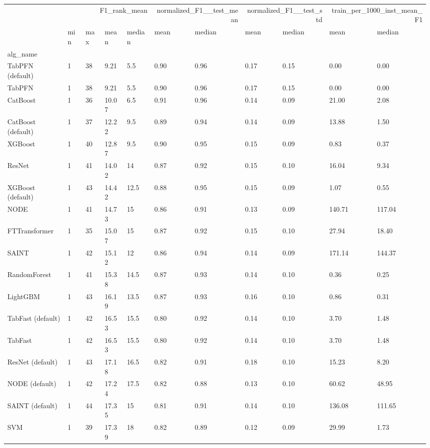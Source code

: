 \begin{tabular}{lllllllllll}
\toprule
 & \multicolumn{4}{r}{F1_rank_mean} & \multicolumn{2}{r}{normalized_F1__test_mean} & \multicolumn{2}{r}{normalized_F1__test_std} & \multicolumn{2}{r}{train_per_1000_inst_mean_F1} \\
 & min & max & mean & median & mean & median & mean & median & mean & median \\
alg_name &  &  &  &  &  &  &  &  &  &  \\
\midrule
TabPFN (default) & 1 & 38 & 9.21 & 5.5 & 0.90 & 0.96 & 0.17 & 0.15 & 0.00 & 0.00 \\
TabPFN & 1 & 38 & 9.21 & 5.5 & 0.90 & 0.96 & 0.17 & 0.15 & 0.00 & 0.00 \\
CatBoost & 1 & 36 & 10.07 & 6.5 & 0.91 & 0.96 & 0.14 & 0.09 & 21.00 & 2.08 \\
CatBoost (default) & 1 & 37 & 12.22 & 9.5 & 0.89 & 0.94 & 0.14 & 0.09 & 13.88 & 1.50 \\
XGBoost & 1 & 40 & 12.87 & 9.5 & 0.90 & 0.95 & 0.15 & 0.09 & 0.83 & 0.37 \\
ResNet & 1 & 41 & 14.02 & 14 & 0.87 & 0.92 & 0.15 & 0.10 & 16.04 & 9.34 \\
XGBoost (default) & 1 & 43 & 14.42 & 12.5 & 0.88 & 0.95 & 0.15 & 0.09 & 1.07 & 0.55 \\
NODE & 1 & 41 & 14.73 & 15 & 0.86 & 0.91 & 0.13 & 0.09 & 140.71 & 117.04 \\
FTTransformer & 1 & 35 & 15.07 & 15 & 0.87 & 0.92 & 0.15 & 0.10 & 27.94 & 18.40 \\
SAINT & 1 & 42 & 15.12 & 12 & 0.86 & 0.94 & 0.14 & 0.09 & 171.14 & 144.37 \\
RandomForest & 1 & 41 & 15.38 & 14.5 & 0.87 & 0.93 & 0.14 & 0.10 & 0.36 & 0.25 \\
LightGBM & 1 & 43 & 16.19 & 13.5 & 0.87 & 0.93 & 0.16 & 0.10 & 0.86 & 0.31 \\
TabFast (default) & 1 & 42 & 16.53 & 15.5 & 0.80 & 0.92 & 0.14 & 0.10 & 3.70 & 1.48 \\
TabFast & 1 & 42 & 16.53 & 15.5 & 0.80 & 0.92 & 0.14 & 0.10 & 3.70 & 1.48 \\
ResNet (default) & 1 & 43 & 17.18 & 16.5 & 0.82 & 0.91 & 0.18 & 0.10 & 15.23 & 8.20 \\
NODE (default) & 1 & 42 & 17.24 & 17.5 & 0.82 & 0.88 & 0.13 & 0.10 & 60.62 & 48.95 \\
SAINT (default) & 1 & 44 & 17.35 & 15 & 0.81 & 0.91 & 0.14 & 0.10 & 136.08 & 111.65 \\
SVM & 1 & 39 & 17.39 & 18 & 0.82 & 0.89 & 0.12 & 0.09 & 29.99 & 1.73 \\

\end{tabular}
